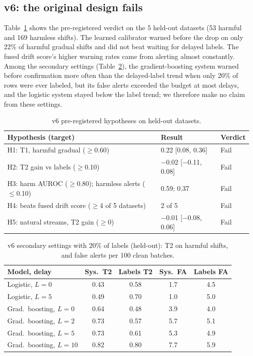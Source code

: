 \documentclass[conference]{IEEEtran}
\begin{document}
\subsection{v6: the original design fails}
Table~\ref{tab:v6} shows the pre-registered verdict on the 5 held-out datasets (53 harmful and 169 harmless shifts). The learned calibrator warned before the drop on only 22\% of harmful gradual shifts and did not beat waiting for delayed labels. The fused drift score's higher warning rates came from alerting almost constantly. Among the secondary settings (Table~\ref{tab:scarce}), the gradient-boosting system warned before confirmation more often than the delayed-label trend when only 20\% of rows were ever labeled, but its false alerts exceeded the budget at most delays, and the logistic system stayed below the label trend; we therefore make no claim from these settings.


\begin{table}[t]
\caption{v6 pre-registered hypotheses on held-out datasets.}
\label{tab:v6}
\centering
\footnotesize
\begin{tabular}{@{}p{3.55cm}p{2.75cm}l@{}}
\toprule
Hypothesis (target) & Result & Verdict \\
\midrule
H1: T1, harmful gradual ($\geq$0.60) & 0.22 [0.08, 0.36] & Fail \\
H2: T2 gain vs labels ($\geq$0.10) & $-$0.02 [$-$0.11, 0.08] & Fail \\
H3: harm AUROC ($\geq$0.80); harmless alerts ($\leq$0.10) & 0.59; 0.37 & Fail \\
H4: beats fused drift score ($\geq$4 of 5 datasets) & 2 of 5 & Fail \\
H5: natural streams, T2 gain ($\geq$0) & $-$0.01 [$-$0.08, 0.06] & Fail \\
\bottomrule
\end{tabular}
\end{table}
\begin{table}[t]
\caption{v6 secondary settings with 20\% of labels (held-out): T2 on harmful shifts, and false alerts per 100 clean batches.}
\label{tab:scarce}
\centering
\footnotesize
\setlength{\tabcolsep}{4pt}
\begin{tabular}{@{}lcccc@{}}
\toprule
Model, delay & Sys.\ T2 & Labels T2 & Sys.\ FA & Labels FA \\
\midrule
Logistic, $L{=}0$ & 0.43 & 0.58 & 1.7 & 4.5 \\
Logistic, $L{=}5$ & 0.49 & 0.70 & 1.0 & 5.0 \\
Grad.\ boosting, $L{=}0$ & 0.64 & 0.48 & 3.9 & 4.0 \\
Grad.\ boosting, $L{=}2$ & 0.73 & 0.57 & 5.7 & 5.1 \\
Grad.\ boosting, $L{=}5$ & 0.73 & 0.61 & 5.3 & 4.9 \\
Grad.\ boosting, $L{=}10$ & 0.82 & 0.80 & 7.7 & 5.9 \\
\bottomrule
\end{tabular}
\end{table}
\end{document}
